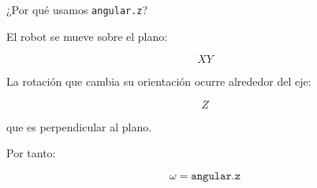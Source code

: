 \documentclass[aspectratio=169]{beamer}
\begin{document}
\begin{frame}{¿Por qué usamos \texorpdfstring{\texttt{angular.z}}{angular.z}?}

    El robot se mueve sobre el plano:

    \[
    XY
    \]

    La rotación que cambia su orientación ocurre alrededor del eje:

    \[
    Z
    \]

    que es perpendicular al plano.

    Por tanto:

    \[
    \boxed{
        \omega=\texttt{angular.z}
    }
    \]

\end{frame}

\end{document}
